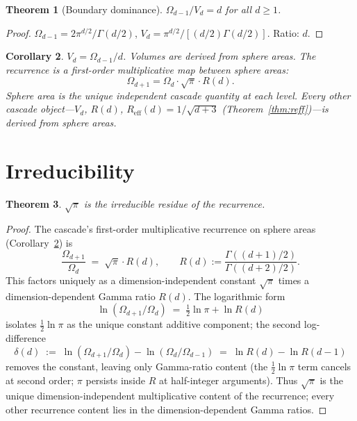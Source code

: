 \documentclass[11pt,a4paper]{article}
\newtheorem{theorem}{Theorem}[section]
\newtheorem{corollary}[theorem]{Corollary}
\begin{document}
\begin{theorem}[Boundary dominance]\label{thm:boundary}
$\Omega_{d-1}/V_d = d$ for all $d\geq 1$.
\end{theorem}

\begin{proof}
$\Omega_{d-1} = 2\pi^{d/2}/\Gamma(d/2)$,\;
$V_d = \pi^{d/2}/[(d/2)\Gamma(d/2)]$.\; Ratio: $d$.
\end{proof}

\begin{corollary}\label{cor:primary}
$V_d = \Omega_{d-1}/d$. Volumes are derived from sphere areas. The
recurrence is a first-order multiplicative map between sphere areas:
\[
\Omega_{d+1} = \Omega_d\cdot\sqrt{\pi}\cdot R(d).
\]
Sphere area is the unique independent cascade quantity at each level.
Every other cascade object---$V_d$, $R(d)$,
$R_{\mathrm{eff}}(d) = 1/\sqrt{d+3}$ (Theorem~\ref{thm:reff})---is
derived from sphere areas.
\end{corollary}

\section{Irreducibility}\label{sec:irreducibility}

\begin{theorem}\label{thm:irred}
$\sqrt{\pi}$ is the irreducible residue of the recurrence.
\end{theorem}

\begin{proof}
The cascade's first-order multiplicative recurrence on sphere areas
(Corollary~\ref{cor:primary}) is
\[
\frac{\Omega_{d+1}}{\Omega_d} \;=\; \sqrt{\pi}\cdot R(d),
\qquad R(d) := \frac{\Gamma((d+1)/2)}{\Gamma((d+2)/2)}.
\]
This factors uniquely as a dimension-independent constant
$\sqrt{\pi}$ times a dimension-dependent Gamma ratio $R(d)$. The
logarithmic form
\[
\ln(\Omega_{d+1}/\Omega_d) \;=\; \tfrac{1}{2}\ln\pi + \ln R(d)
\]
isolates $\tfrac{1}{2}\ln\pi$ as the unique constant additive
component; the second log-difference
\[
\delta(d) \;:=\;
\ln(\Omega_{d+1}/\Omega_d) - \ln(\Omega_d/\Omega_{d-1})
\;=\; \ln R(d) - \ln R(d-1)
\]
removes the constant, leaving only Gamma-ratio content (the
$\tfrac{1}{2}\ln\pi$ term cancels at second order; $\pi$ persists
inside $R$ at half-integer arguments). Thus $\sqrt{\pi}$ is the
unique dimension-independent multiplicative content of the
recurrence; every other recurrence content lies in the
dimension-dependent Gamma ratios.
\end{proof}
\end{document}
